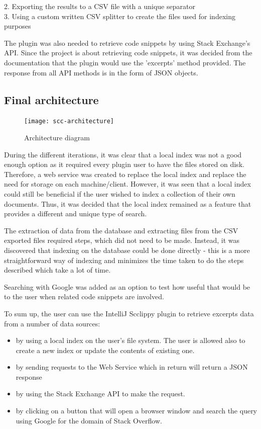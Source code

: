 \documentclass{l4proj}
\begin{document}
2. Exporting the results to a CSV file with a unique separator\\
3. Using a custom written CSV splitter to create the files used for indexing purposes

The plugin was also needed to retrieve code snippets by using Stack Exchange's API. Since the project is about retrieving code snippets, it was decided from the documentation that the plugin would use the 'excerpts' method provided. The response from all API methods is in the form of JSON objects.

\subsection{Final architecture}

\begin{figure}[H]
\texttt{[image: scc-architecture]}
\centering
\caption{Architecture diagram}
\label{fig:architecture}
\end{figure}

During the different iterations, it was clear that a local index was not a good enough option as it required every plugin user to have the files stored on disk. Therefore, a web service was created to replace the local index and replace the need for storage on each machine/client. However, it was seen that a local index could still be beneficial if the user wished to index a collection of their own documents. Thus, it was decided that the local index remained as a feature that provides a different and unique type of search.

The extraction of data from the database and extracting files from the CSV exported files required steps, which did not need to be made. Instead, it was discovered that indexing on the database could be done directly - this is a more straightforward way of indexing and minimizes the time taken to do the steps described which take a lot of time.

Searching with Google was added as an option to test how useful that would be to the user when related code snippets are involved.

To sum up, the user can use the IntelliJ Scclippy plugin to retrieve excerpts data from a number of data sources:

\begin{itemize}
\item by using a local index on the user's file system. The user is allowed also to create a new index or update the contents of existing one. 
\item by sending requests to the Web Service which in return will return a JSON response
\item by using the Stack Exchange API to make the request.
\item by clicking on a button that will open a browser window and search the query using Google for the domain of Stack Overflow. 
\end{itemize}
\end{document}
